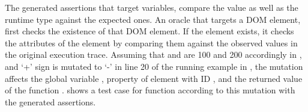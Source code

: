 The generated assertions that target variables, compare the value as well as the runtime type against the expected ones. 
%
An oracle that targets a DOM element, first checks the existence of that DOM element. If the element exists,  it checks the attributes of the element by comparing them against the observed values in the original execution trace. 
Assuming that  and  are 100 and 200 accordingly in , and
`+' sign is mutated to `-' in line 20 of the running example in , the mutation affects the global variable ,  property of element with ID , and the returned value of the function .  shows a \qunit test case for  function according to this mutation with the generated assertions.  
   






